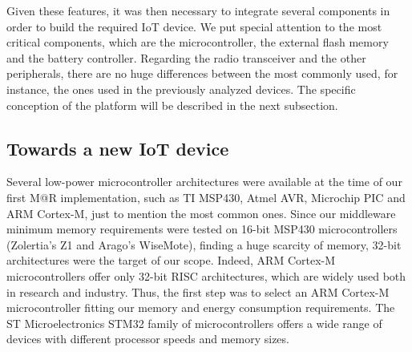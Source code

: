 Given these features, it was then necessary to integrate several components in order to build the required IoT device.
We put special attention to the most critical components, which are the microcontroller, the external flash memory and the battery controller.
Regarding the radio transceiver and the other peripherals, there are no huge differences between the most commonly used, for instance, the ones used in the previously analyzed devices.
The specific conception of the platform will be described in the next subsection.

\subsection{Towards a new IoT device}
\label{subsec:newIoTDevice}
Several low-power microcontroller architectures were available at the time of our first M@R implementation, such as TI MSP430, Atmel AVR, Microchip PIC and ARM Cortex-M, just to mention the most common ones.
Since our middleware minimum memory requirements were tested on 16-bit MSP430 microcontrollers (Zolertia's Z1 and Arago's WiseMote), finding a huge scarcity of memory, 32-bit architectures were the target of our scope.
Indeed, ARM Cortex-M microcontrollers offer only 32-bit RISC architectures, which are widely used both in research and industry.
Thus, the first step was to select an ARM Cortex-M microcontroller fitting our memory and energy consumption requirements.
The ST Microelectronics STM32 family of microcontrollers offers a wide range of devices with different processor speeds and memory sizes.


